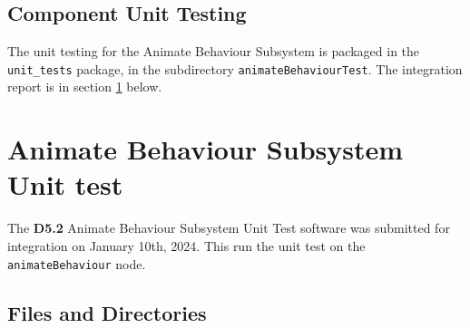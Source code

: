 \documentclass{CSSRforAfrica}
\begin{document}
\subsection{Component Unit Testing}
\label{subsection:animate_behaviour_unit_testing}

The unit testing for the Animate Behaviour Subsystem is packaged in the {\small \verb+unit_tests+} package, in the subdirectory {\small \verb+animateBehaviourTest+}. The integration report is in section \ref{section:animate_behaviour_test} below.

  
%  



\newpage
 \section{Animate Behaviour Subsystem Unit test} 
\label{section:animate_behaviour_test}
The \textbf{D5.2} Animate Behaviour Subsystem Unit Test software was submitted for integration on January 10th, 2024. This run the unit test on the {\small \verb+animateBehaviour+} node.

\subsection{Files and Directories}
\label{subsection:animate_behaviour_test_files}
 
\end{document}
